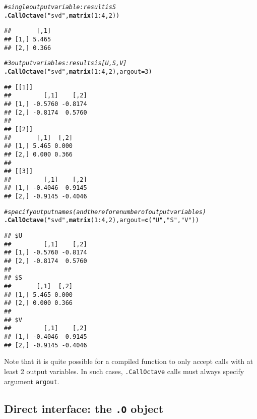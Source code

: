 \documentclass[english,10pt,a4paper]{article}\usepackage[]{graphicx}\usepackage[]{color}
\makeatletter
\newcommand{\hlnum}[1]{\textcolor[rgb]{0.686,0.059,0.569}{#1}}%
\newcommand{\hlstr}[1]{\textcolor[rgb]{0.192,0.494,0.8}{#1}}%
\newcommand{\hlcom}[1]{\textcolor[rgb]{0.678,0.584,0.686}{\textit{#1}}}%
\newcommand{\hlopt}[1]{\textcolor[rgb]{0,0,0}{#1}}%
\newcommand{\hlstd}[1]{\textcolor[rgb]{0.345,0.345,0.345}{#1}}%
\newcommand{\hlkwc}[1]{\textcolor[rgb]{0.333,0.667,0.333}{#1}}%
\newcommand{\hlkwd}[1]{\textcolor[rgb]{0.737,0.353,0.396}{\textbf{#1}}}%
\newenvironment{kframe}{%
 \def\at@end@of@kframe{}%
 \ifinner\ifhmode%
  \def\at@end@of@kframe{\end{minipage}}%
  \begin{minipage}{\columnwidth}%
 \fi\fi%
 \def\FrameCommand##1{\hskip\@totalleftmargin \hskip-\fboxsep
 \colorbox{shadecolor}{##1}\hskip-\fboxsep
     \hskip-\linewidth \hskip-\@totalleftmargin \hskip\columnwidth}%
 \MakeFramed {\advance\hsize-\width
   \@totalleftmargin\z@ \linewidth\hsize
   \@setminipage}}%
 {\par\unskip\endMakeFramed%
 \at@end@of@kframe}
\newenvironment{knitrout}{}{} %
\let\code=\texttt
\makeatother
\begin{document}
\begin{knitrout}
\color{fgcolor}\begin{kframe}
\begin{alltt}
\hlcom{# single output variable: result is S}
\hlkwd{.CallOctave}\hlstd{(}\hlstr{"svd"}\hlstd{,} \hlkwd{matrix}\hlstd{(}\hlnum{1}\hlopt{:}\hlnum{4}\hlstd{,} \hlnum{2}\hlstd{))}
\end{alltt}
\begin{verbatim}
##       [,1]
## [1,] 5.465
## [2,] 0.366
\end{verbatim}
\begin{alltt}
\hlcom{# 3 output variables: results is [U,S,V]}
\hlkwd{.CallOctave}\hlstd{(}\hlstr{"svd"}\hlstd{,} \hlkwd{matrix}\hlstd{(}\hlnum{1}\hlopt{:}\hlnum{4}\hlstd{,} \hlnum{2}\hlstd{),} \hlkwc{argout} \hlstd{=} \hlnum{3}\hlstd{)}
\end{alltt}
\begin{verbatim}
## [[1]]
##         [,1]    [,2]
## [1,] -0.5760 -0.8174
## [2,] -0.8174  0.5760
## 
## [[2]]
##       [,1]  [,2]
## [1,] 5.465 0.000
## [2,] 0.000 0.366
## 
## [[3]]
##         [,1]    [,2]
## [1,] -0.4046  0.9145
## [2,] -0.9145 -0.4046
\end{verbatim}
\begin{alltt}
\hlcom{# specify output names (and therefore number of output variables)}
\hlkwd{.CallOctave}\hlstd{(}\hlstr{"svd"}\hlstd{,} \hlkwd{matrix}\hlstd{(}\hlnum{1}\hlopt{:}\hlnum{4}\hlstd{,} \hlnum{2}\hlstd{),} \hlkwc{argout} \hlstd{=} \hlkwd{c}\hlstd{(}\hlstr{"U"}\hlstd{,} \hlstr{"S"}\hlstd{,} \hlstr{"V"}\hlstd{))}
\end{alltt}
\begin{verbatim}
## $U
##         [,1]    [,2]
## [1,] -0.5760 -0.8174
## [2,] -0.8174  0.5760
## 
## $S
##       [,1]  [,2]
## [1,] 5.465 0.000
## [2,] 0.000 0.366
## 
## $V
##         [,1]    [,2]
## [1,] -0.4046  0.9145
## [2,] -0.9145 -0.4046
\end{verbatim}
\end{kframe}
\end{knitrout}


Note that it is quite possible for a compiled function to only accept
calls with at least 2 output variables.
In such cases, \code{.CallOctave} calls must always specify argument
\code{argout}.

\subsection{Direct interface: the \texttt{.O} object}
\end{document}
